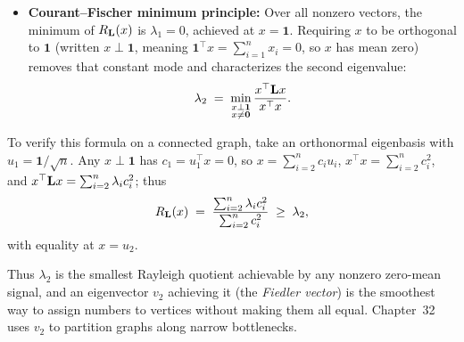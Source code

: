\begin{formalbox}
\begin{itemize}
  \item \textbf{Courant--Fischer minimum principle:} Over all nonzero vectors, the minimum of $R_{\mathbf{L}}(x)$ is $\lambda_1 = 0$, achieved at $x = \mathbf{1}$. Requiring $x$ to be orthogonal to $\mathbf{1}$ (written $x \perp \mathbf{1}$, meaning $\mathbf{1}^\top x = \sum_{i=1}^n x_i = 0$, so $x$ has mean zero) removes that constant mode and characterizes the second eigenvalue:
  \[
    \lambda_2 \;=\; \min_{\substack{x \perp \mathbf{1} \\ x\neq \mathbf{0}}} \frac{x^\top \mathbf{L} x}{x^\top x}.
  \]
\end{itemize}
To verify this formula on a connected graph, take an orthonormal eigenbasis with $u_1=\mathbf{1}/\sqrt n$. Any $x\perp\mathbf{1}$ has $c_1 = u_1^\top x = 0$, so $x=\sum_{i=2}^n c_i u_i$, $x^\top x = \sum_{i=2}^n c_i^2$, and $x^\top \mathbf{L} x = \sum_{i=2}^n \lambda_i c_i^2$; thus
\[
  R_{\mathbf{L}}(x) \;=\; \frac{\sum_{i=2}^n \lambda_i c_i^2}{\sum_{i=2}^n c_i^2} \;\ge\; \lambda_2,
\]
with equality at $x=u_2$.
\end{formalbox}

Thus $\lambda_2$ is the smallest Rayleigh quotient achievable by any nonzero zero-mean signal, and an eigenvector $v_2$ achieving it (the \emph{Fiedler vector}) is the smoothest way to assign numbers to vertices without making them all equal. Chapter~32 uses $v_2$ to partition graphs along narrow bottlenecks.

